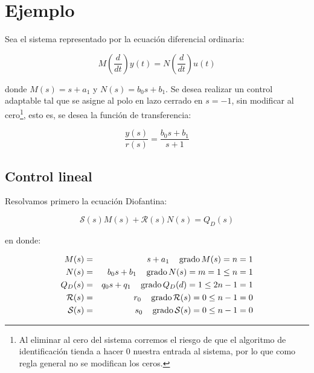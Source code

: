 
    \newpage
    \section{Ejemplo}

        Sea el sistema representado por la ecuación diferencial ordinaria:

        \begin{equation}
            M \left( \frac{d}{dt} \right) y(t) = N \left( \frac{d}{dt} \right) u(t)
        \end{equation}

        donde $M(s) = s + a_1$ y $N(s) = b_0 s + b_1$.
        Se desea realizar un control adaptable tal que se asigne al polo en lazo cerrado en $s = -1$, sin modificar al cero\footnote{Al eliminar al cero del sistema corremos el riesgo de que el algoritmo de identificación tienda a hacer $0$ nuestra entrada al sistema, por lo que como regla general no se modifican los ceros.}, esto es, se desea la función de transferencia:

        \begin{equation}
            \frac{y(s)}{r(s)} = \frac{b_0 s + b_1}{s + 1}
        \end{equation}

        \subsection{Control lineal}

            Resolvamos primero la ecuación Diofantina:

            \begin{equation*}
                \mathcal{S}(s) M(s) + \mathcal{R}(s) N(s) = Q_D(s)
            \end{equation*}

            en donde:

            \begin{eqnarray}
                M(s) & = & s + a_1 \quad \operatorname{grado}{M(s)} = n = 1 \nonumber \\
                N(s) & = & b_0 s + b_1 \quad \operatorname{grado}{N(s)} = m = 1 \le n = 1 \nonumber \\
                Q_D(s) & = & q_0 s + q_1 \quad \operatorname{grado}{Q_D(d)} = 1 \le 2n - 1 = 1 \nonumber \\
                \mathcal{R}(s) & = & r_0 \quad \operatorname{grado}{\mathcal{R}(s)} = 0 \le n - 1 = 0 \nonumber \\
                \mathcal{S}(s) & = & s_0 \quad \operatorname{grado}{\mathcal{S}(s)} = 0 \le n - 1 = 0
            \end{eqnarray}

